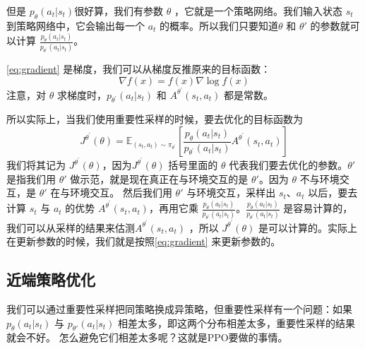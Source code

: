 但是 $p_{\theta}(a_t|s_t)$很好算，我们有参数 $\theta$ ，它就是一个策略网络。我们输入状态 $s_t$ 到策略网络中，它会输出每一个 $a_t$ 的概率。所以我们只要知道$\theta$ 和 $\theta'$ 的参数就可以计算
$\frac{p_{\theta}\left(a_{t} | s_{t}\right)}{p_{\theta^{\prime}}\left(a_{t} | s_{t}\right)}$。

\eqref{eq:gradient} 是梯度，我们可以从梯度反推原来的目标函数：
\begin{equation}
    \label{eq:grad_object}
    \nabla f(x)=f(x) \nabla \log f(x)
\end{equation}
注意，对 $\theta$ 求梯度时，$p_{\theta^{\prime}}(a_{t} | s_{t})$ 和 $A^{\theta^{\prime}}\left(s_{t}, a_{t}\right)$ 都是常数。

所以实际上，当我们使用重要性采样的时候，要去优化的目标函数为
\begin{equation}
    \label{eq:IS_obj}
    J^{\theta^{\prime}}(\theta)=\mathbb{E}_{\left(s_{t}, a_{t}\right) \sim \pi_{\theta^{\prime}}}\left[\frac{p_{\theta}\left(a_{t} | s_{t}\right)}{p_{\theta^{\prime}}\left(a_{t} | s_{t}\right)} A^{\theta^{\prime}}\left(s_{t}, a_{t}\right)\right]
\end{equation}
我们将其记为 $J^{\theta^{\prime}}(\theta)$，因为$J^{\theta^{\prime}}(\theta)$ 括号里面的 $\theta$ 代表我们要去优化的参数。$\theta'$  是指我们用 $\theta'$  做示范，就是现在真正在与环境交互的是 $\theta'$。因为 $\theta$ 不与环境交互，是 $\theta'$  在与环境交互。
然后我们用 $\theta'$  与环境交互，采样出 $s_t$、$a_t$ 以后，要去计算 $s_t$ 与 $a_t$ 的优势 $A^{\theta^{\prime}}\left(s_{t}, a_{t}\right)$，再用它乘 $\frac{p_{\theta}\left(a_{t} | s_{t}\right)}{p_{\theta^{\prime}}\left(a_{t} | s_{t}\right)}$。$\frac{p_{\theta}\left(a_{t} | s_{t}\right)}{p_{\theta^{\prime}}\left(a_{t} | s_{t}\right)}$ 是容易计算的，
我们可以从采样的结果来估测$A^{\theta^{\prime}}\left(s_{t}, a_{t}\right)$ ，所以 $J^{\theta^{\prime}}(\theta)$ 是可以计算的。实际上在更新参数的时候，我们就是按照\eqref{eq:gradient} 来更新参数的。

\subsection{近端策略优化} 

我们可以通过重要性采样把同策略换成异策略，但重要性采样有一个问题：如果 $p_{\theta}\left(a_{t} | s_{t}\right)$ 与 $p_{\theta'}\left(a_{t} | s_{t}\right)$ 相差太多，即这两个分布相差太多，重要性采样的结果就会不好。
怎么避免它们相差太多呢？这就是PPO要做的事情。

